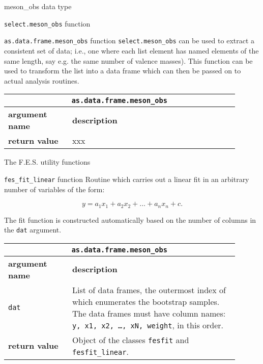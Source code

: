 \documentclass[10pt,a4paper]{article}
\begin{document}
\begin{section}{{\ttfamily meson\_obs} data type}
\begin{subsection}{{\tt select.meson\_obs} function}
\end{subsection}

\begin{subsection}{ {\tt as.data.frame.meson\_obs} function }
{\tt select.meson\_obs} can be used to extract a consistent set of data; i.e., one where each list element has named elements of the same length, say e.g. the same number of valence masses).
This function can be used to transform the list into a data frame which can then be passed on to actual analysis routines.

{ \centering
\begin{tabular}{|p{0.25\linewidth}|p{0.65\linewidth}|}
\hline
\multicolumn{2}{|c|}{ {\tt as.data.frame.meson\_obs} } \\
\hline \hline \textbf{argument name} & \textbf{description} \\ \hline
\hline 
\textbf{return value} & xxx \\
\hline
\end{tabular}
} %

\end{subsection}

\begin{section}{The F.E.S. utility functions}

\begin{subsection}{ {\tt fes\_fit\_linear} function }
Routine which carries out a linear fit in an arbitrary number of variables of the form:

\begin{equation}
y=a_1 x_1 + a_2 x_2 + \ldots + a_n x_n + c.
\end{equation}

The fit function is constructed automatically based on the number of columns in the {\tt dat} argument.

{ \centering
\begin{tabular}{|p{0.25\linewidth}|p{0.65\linewidth}|}
\hline
\multicolumn{2}{|c|}{ {\tt as.data.frame.meson\_obs} } \\
\hline \hline \textbf{argument name} & \textbf{description} \\ \hline
{\tt dat} & List of data frames, the outermost index of which enumerates the bootstrap samples.
The data frames must have column names: {\tt y, x1, x2, \ldots, xN, weight}, in this order. \\
\hline 
\textbf{return value} & Object of the classes {\tt fesfit} and {\tt fesfit\_linear}. \\
\hline
\end{tabular}
} %


\end{subsection}
\end{section}
\end{section}
\end{document}
